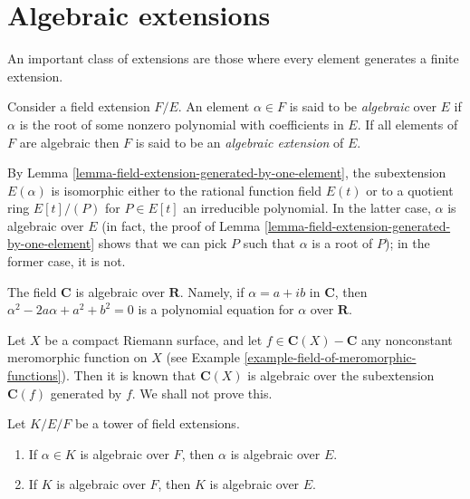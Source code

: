 \section{Algebraic extensions}
\label{section-algebraic-extensions}

\noindent
An important class of extensions are those where every element generates
a finite extension.

\begin{definition}
\label{definition-algebraic}
Consider a field extension $F/E$. An element $\alpha \in F$ is said to be
{\it algebraic} over $E$ if $\alpha$ is the root of some nonzero polynomial
with coefficients in $E$. If all elements of $F$ are algebraic then $F$ is
said to be an {\it algebraic extension} of $E$.
\end{definition}

\noindent
By Lemma \ref{lemma-field-extension-generated-by-one-element}, the
subextension $E(\alpha)$ is isomorphic either to the rational function
field $E(t)$ or to a quotient ring $E[t]/(P)$ for $P \in E[t]$ an
irreducible polynomial. In the latter case, $\alpha$ is algebraic over
$E$ (in fact, the proof of
Lemma \ref{lemma-field-extension-generated-by-one-element}
shows that we can pick $P$ such that $\alpha$ is a root of $P$);
in the former case, it is not.

\begin{example}
\label{example-C-algebraic-over-R}
The field $\mathbf{C}$ is algebraic over $\mathbf{R}$. Namely, if
$\alpha = a + ib$ in $\mathbf{C}$, then $\alpha^2 - 2a\alpha + a^2 + b^2 = 0$
is a polynomial equation for $\alpha$ over $\mathbf{R}$.
\end{example}

\begin{example}
\label{example-compact-riemann-surface-is-finite-over-P1}
Let $X$ be a compact Riemann surface, and let
$f \in \mathbf{C}(X) - \mathbf{C}$ any nonconstant meromorphic function
on $X$ (see Example \ref{example-field-of-meromorphic-functions}). Then it is
known that $\mathbf{C}(X)$ is algebraic over the subextension
$\mathbf{C}(f)$ generated by $f$. We shall not prove this.
\end{example}

\begin{lemma}
\label{lemma-algebraic-goes-up}
Let $K/E/F$ be a tower of field extensions.
\begin{enumerate}
\item If $\alpha \in K$ is algebraic over $F$, then $\alpha$ is algebraic
over $E$.
\item If $K$ is algebraic over $F$, then $K$ is algebraic over $E$.
\end{enumerate}
\end{lemma}

